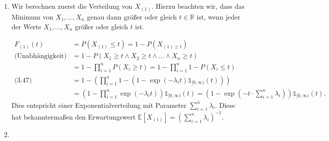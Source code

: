 \documentclass[a4paper]{article}
\begin{document}
\addtocounter{subsection}{1}

\subsection{}

\begin{enumerate}
	\item Wir berechnen zuerst die Verteilung von $X_{(1)}$. Hierzu beachten wir, dass das Minimum von $X_1, \dots, X_n$ genau dann größer oder gleich $t \in \mathds{R}$ ist, wenn jeder der Werte $X_1, \dots, X_n$ größer oder gleich $t$ ist.

	      \begin{align*}
		      F_{(1)}(t)              & = P(X_{(1)} \leq t) = 1 - P(X_{(1) \geq t})                                                                                                                                                              \\
		      \text{(Unabhängigkeit)} & = 1- P(X_1 \geq t \wedge X_2 \geq t \wedge \dots \wedge X_n \geq t)                                                                                                                                      \\
		                              & = 1 - \prod_{i=1}^{n} P(X_i \geq t) = 1- \prod_{i=1}^{n} 1 - P(X_i \leq t)                                                                                                                             & \\
		      \text{(3.47)}           & = 1 - \left(\prod_{i = 1}^{n} 1 - \left( 1 - \exp(- \lambda_i t) \mathds{1}_{[0, \infty)}(t)\right) \right)                                                                                              \\
		                              & = \left( 1 - \prod_{i = 1}^{n} \exp(- \lambda_i t) \right) \mathds{1}_{[0, \infty)}(t) = \left( 1 - \exp\left( -t \cdot \sum_{i =1}^{n} \lambda_i  \right) \right) \mathds{1}_{[0, \infty)}(t)\text{.}
	      \end{align*}
	      Dies entspricht einer Exponentialverteilung mit Parameter $\sum_{i=1}^{n} \lambda_i$. Diese hat bekanntermaßen den Erwartungswert $\mathds{E}[X_{(1)}] = \left(\sum_{i=1}^{n} \lambda_i\right)^{-1}$.
	\item


\end{enumerate}
\end{document}
